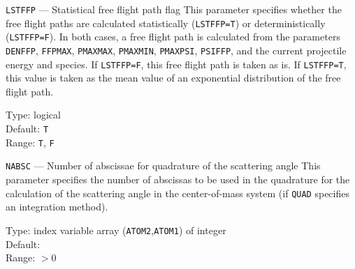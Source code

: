 \begin{keydescription}{\texttt{LSTFFP} --- Statistical free flight path flag}
%
  This parameter specifies whether the free flight paths are calculated 
  statistically (\texttt{LSTFFP=T}) or deterministically (\texttt{LSTFFP=F}). 
  In both cases, a free flight path is calculated from the parameters 
  \texttt{DENFFP}, \texttt{FFPMAX}, \texttt{PMAXMAX}, \texttt{PMAXMIN}, 
  \texttt{PMAXPSI}, \texttt{PSIFFP}, and the current projectile energy and 
  species. If \texttt{LSTFFP=F}, this free flight path is taken as is. If 
  \texttt{LSTFFP=T}, this value is taken as the mean value of an exponential
  distribution of the free flight path.
  \begin{keytab}
    Type:    \> logical \\
    Default: \> \texttt{T} \\
    Range:   \> \texttt{T}, \texttt{F}
  \end{keytab}
\end{keydescription}

\begin{keydescription}{\texttt{NABSC} --- Number of abscissae for quadrature
   of the scattering angle}
%
  This parameter specifies the number of abscissas to be used in the quadrature 
  for the calculation of the scattering angle in the center-of-mass system (if 
  \texttt{QUAD} specifies an integration method).
  \begin{keytab}
    Type:    \> index variable array (\texttt{ATOM2},\texttt{ATOM1}) 
                of integer \\
    Default:  \\
    Range:   \> $> 0$
  \end{keytab}
\end{keydescription}

\iffalse
\begin{keydescription}{\texttt{NABSCTIME} --- Number of abscissas for quadrature
   of the time integral}
%
  This parameter specifies the number of abscissas to be used in the quadrature 
  for the calculation of the time integral (if \texttt{QUADTIME} specifies an 
  integration method).
  \begin{keytab}
    Type:    \> index variable array (\texttt{ATOM2},\texttt{ATOM1}) 
                of integer \\
    Default: \> 4 \\
    Range:   \> $> 0$
  \end{keytab}
\end{keydescription}
\fi

